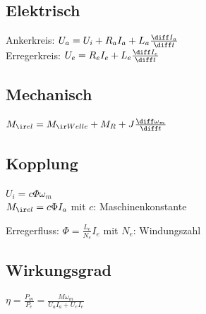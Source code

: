 \documentclass[german]{latex4ei_fs}
\begin{document}
\begin{sectionbox}

\subsection*{Elektrisch}

Ankerkreis: $U_a = U_i + R_a I_a + L_a \frac{\diff I_a}{ \diff t}$ \\
Erregerkreis: $U_e = R_e I_e + L_e \frac{\diff I_e}{\diff t}$

\subsection*{Mechanisch}
$M_{\ir el} = M_{\ir Welle} + M_R + J \frac{\diff \omega_m}{\diff t}$

\subsection*{Kopplung}
$U_i = c \Phi \omega_m$ \\
$M_{\ir el} = c \Phi I_a$ \quad mit $c$: Maschinenkonstante

Erregerfluss: $\Phi = \frac{L_e}{N_e} I_e$ \quad mit $N_e$: Windungszahl


\subsection*{Wirkungsgrad}
$\eta = \frac{P_m}{P_e} = \frac{M \omega_m}{U_a I_a + U_e I_e}$
\end{sectionbox}
\end{document}
